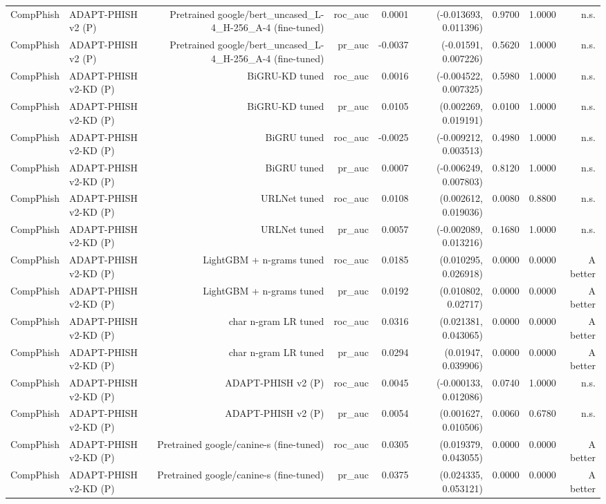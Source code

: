 \begin{table}[t]
\begin{tabular}{llrrrrrrr}
CompPhish & ADAPT-PHISH v2 (P) & Pretrained google/bert\_uncased\_L-4\_H-256\_A-4 (fine-tuned) & roc\_auc & 0.0001 & (-0.013693, 0.011396) & 0.9700 & 1.0000 & n.s. \\
CompPhish & ADAPT-PHISH v2 (P) & Pretrained google/bert\_uncased\_L-4\_H-256\_A-4 (fine-tuned) & pr\_auc & -0.0037 & (-0.01591, 0.007226) & 0.5620 & 1.0000 & n.s. \\
CompPhish & ADAPT-PHISH v2-KD (P) & BiGRU-KD tuned & roc\_auc & 0.0016 & (-0.004522, 0.007325) & 0.5980 & 1.0000 & n.s. \\
CompPhish & ADAPT-PHISH v2-KD (P) & BiGRU-KD tuned & pr\_auc & 0.0105 & (0.002269, 0.019191) & 0.0100 & 1.0000 & n.s. \\
CompPhish & ADAPT-PHISH v2-KD (P) & BiGRU tuned & roc\_auc & -0.0025 & (-0.009212, 0.003513) & 0.4980 & 1.0000 & n.s. \\
CompPhish & ADAPT-PHISH v2-KD (P) & BiGRU tuned & pr\_auc & 0.0007 & (-0.006249, 0.007803) & 0.8120 & 1.0000 & n.s. \\
CompPhish & ADAPT-PHISH v2-KD (P) & URLNet tuned & roc\_auc & 0.0108 & (0.002612, 0.019036) & 0.0080 & 0.8800 & n.s. \\
CompPhish & ADAPT-PHISH v2-KD (P) & URLNet tuned & pr\_auc & 0.0057 & (-0.002089, 0.013216) & 0.1680 & 1.0000 & n.s. \\
CompPhish & ADAPT-PHISH v2-KD (P) & LightGBM + n-grams tuned & roc\_auc & 0.0185 & (0.010295, 0.026918) & 0.0000 & 0.0000 & A better \\
CompPhish & ADAPT-PHISH v2-KD (P) & LightGBM + n-grams tuned & pr\_auc & 0.0192 & (0.010802, 0.02717) & 0.0000 & 0.0000 & A better \\
CompPhish & ADAPT-PHISH v2-KD (P) & char n-gram LR tuned & roc\_auc & 0.0316 & (0.021381, 0.043065) & 0.0000 & 0.0000 & A better \\
CompPhish & ADAPT-PHISH v2-KD (P) & char n-gram LR tuned & pr\_auc & 0.0294 & (0.01947, 0.039906) & 0.0000 & 0.0000 & A better \\
CompPhish & ADAPT-PHISH v2-KD (P) & ADAPT-PHISH v2 (P) & roc\_auc & 0.0045 & (-0.000133, 0.012086) & 0.0740 & 1.0000 & n.s. \\
CompPhish & ADAPT-PHISH v2-KD (P) & ADAPT-PHISH v2 (P) & pr\_auc & 0.0054 & (0.001627, 0.010506) & 0.0060 & 0.6780 & n.s. \\
CompPhish & ADAPT-PHISH v2-KD (P) & Pretrained google/canine-s (fine-tuned) & roc\_auc & 0.0305 & (0.019379, 0.043055) & 0.0000 & 0.0000 & A better \\
CompPhish & ADAPT-PHISH v2-KD (P) & Pretrained google/canine-s (fine-tuned) & pr\_auc & 0.0375 & (0.024335, 0.053121) & 0.0000 & 0.0000 & A better \\

\end{tabular}
\end{table}
